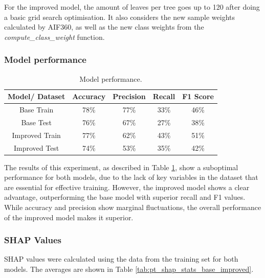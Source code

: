 \documentclass[fleqn,10pt]{wlscirep}
\begin{document}
For the improved model, the amount of leaves per tree goes up to 120 after doing a basic grid search optimisation. It also considers the new sample weights calculated by AIF360, as well as the new class weights from the \textit{compute\_class\_weight} function.

\subsubsection{Model performance}

\begin{table}[!htb]
\centering
\begin{tabular}{|c|c|c|c|c|}
\hline
        \textbf{Model/ Dataset} & \textbf{Accuracy} & \textbf{Precision} & \textbf{Recall} & \textbf{F1 Score} \\ \hline
        
        Base Train & 78\% & 77\% & 33\% & 46\% \\ 
        Base Test & 76\% & 67\% & 27\% & 38\% \\ 
        Improved Train & 77\% & 62\% & 43\% & 51\% \\ 
        Improved Test & 74\% & 53\% & 35\% & 42\% \\ 
        \hline

    \end{tabular}
\caption{Model performance.}
\label{tab_perf_hfalta:}
\end{table}

The results of this experiment, as described in Table \ref{tab_perf_hfalta:}, show a suboptimal performance for both models, due to the lack of key variables in the dataset that are essential for effective training. However, the improved model shows a clear advantage, outperforming the base model with superior recall and F1 values. While accuracy and precision show marginal fluctuations, the overall performance of the improved model makes it superior.

\subsubsection{SHAP Values}

SHAP values were calculated using the data from the training set for both models. The averages are shown in Table \ref{tab:pt_shap_stats_base_improved}.
\end{document}
